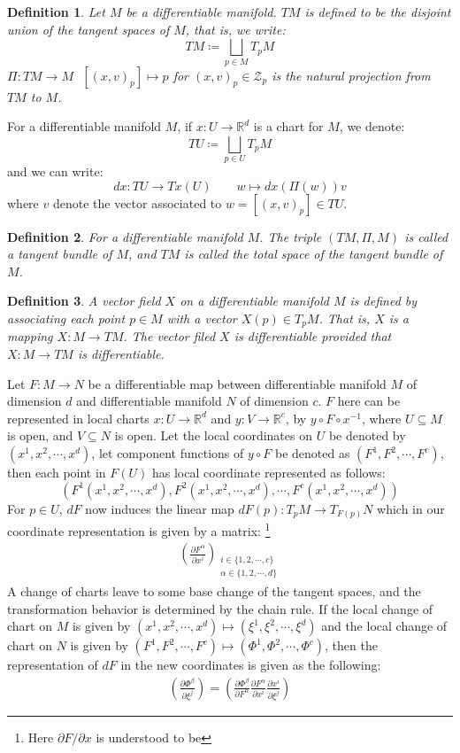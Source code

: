 \documentclass[11pt]{book}
\theoremstyle{break}
\theoremstyle{break}
\newtheorem{defn}{Definition}[corL]
\newcommand{\R}{\mathbb{R}}
\newcommand{\pd}{\partial}
\begin{document}
\begin{defn}
Let $M$ be a differentiable manifold. $TM$ is defined to be the disjoint union of the tangent spaces of $M$, that is, we write:
$$TM \coloneqq  \bigsqcup_{p \in M}T_pM$$ 
$\Pi:TM \to M \ \ \ [(x,v)_p]\mapsto p$ for $(x,v)_p \in \mathcal{Z}_p$ is the natural projection from $TM$ to $M$. 
\end{defn}

For a differentiable manifold $M$, if $x: U \to \R^d$ is a chart for $M$, we denote: 
$$TU \coloneqq \bigsqcup_{p\in U}T_p M$$ 
and we can write:
$$dx:TU \to Tx(U) \qquad w\mapsto dx(\Pi(w))v$$
where $v$ denote the vector associated to $w = [(x,v)_p] \in TU$. \\

\begin{defn}
For a differentiable manifold $M$. The triple $(TM, \Pi, M)$ is called a tangent bundle of $M$, and $TM$ is called the total space of the tangent bundle of $M$. 
\end{defn} 


\begin{defn}
A vector field $X$ on a differentiable manifold $M$ is defined by associating each point $p \in M$ with a vector $X(p) \in T_pM$. That is, $X$ is a mapping $X:M \to TM$. The vector filed $X$ is differentiable provided that $X: M \to TM$ is differentiable.   
\end{defn}


Let $F:M \to N$ be a differentiable map between differentiable manifold $M$ of dimension $d$ and differentiable manifold $N$ of dimension $c$.  $F$  here can be represented in local charts $x:U \to \R^d$ and $y:V\to \R^c$, by $y \circ F \circ x^{-1}$, where $U \subseteq M$ is open, and $V\subseteq N$ is open. Let the local coordinates on $U$ be denoted by $(x^1, x^2,\cdots, x^d)$, let component functions of $y\circ F$ be denoted as $(F^1, F^2,\cdots, F^c)$, then each point in $F(U)$ has local coordinate represented as follows:
$$(F^1(x^1,x^2,\cdots, x^d), F^2(x^1,x^2,\cdots, x^d),\cdots, F^c(x^1,x^2,\cdots, x^d) )$$
For $p \in U$, $dF$ now induces the linear map $dF(p):T_{p}M \to T_{F(p)}N $ which in our coordinate representation is given by a matrix: \footnote{Here $\pd F/\pd x$ is understood to be }
\begin{align*}
\left(\frac{\pd F^\alpha}{\pd x^i} \right)_{\substack{i \in \{1,2,\cdots,c\}\\ 
\alpha \in \{1,2,\cdots, d\}}}
\end{align*}
A change of charts leave to some base change of the tangent spaces, and the transformation behavior is determined by the chain rule. If the local change of chart on $M$ is given by $(x^1, x^2,\cdots, x^d)\mapsto (\xi^1,\xi^2,\cdots, \xi^d)$ and the local change of chart on $N$ is given by $(F^1,F^2,\cdots, F^c)\mapsto (\Phi^1,\Phi^2,\cdots, \Phi^c)$, then the representation of $dF$ in the new coordinates is given as the following:
\begin{align*}
\left(\frac{\pd \Phi^\beta}{\pd \xi^j} \right) = \left( \frac{\pd \Phi^\beta}{\pd F^\alpha}\frac{\pd F^\alpha}{\pd x^i}\frac{\pd x^i}{\pd \xi^j}\right)
\end{align*}
\end{document}
